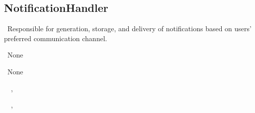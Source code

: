 \subsection{NotificationHandler}\label{comp:OnlineServiceOnlineServiceNotificationHandler}
	\begin{description}
		\item[Responsibility:]~Responsible for generation, storage, and delivery of notifications based on users' preferred communication channel.
		\item[Super-components:]~None
		\item[Sub-components:]~None
		\item[Provided interfaces:]~\iconprovided{}~, \iconprovided{}~
		\item[Required interfaces:]~\iconrequired{}~, \iconrequired{}~		
	\end{description}

